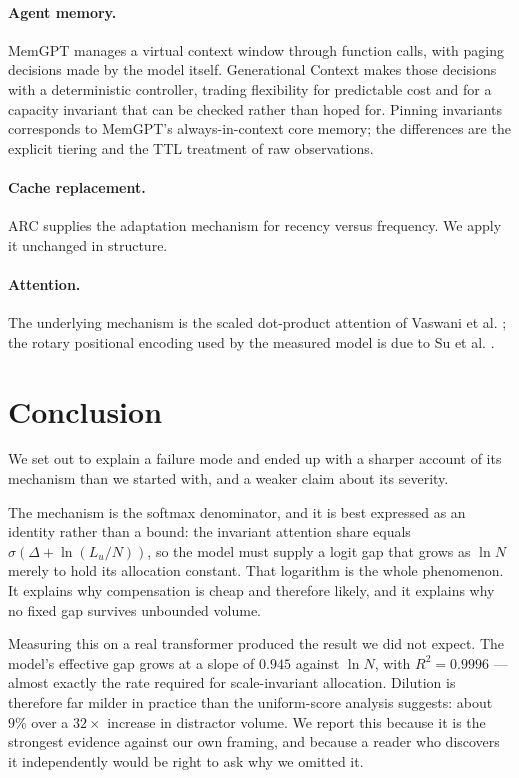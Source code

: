 \documentclass[11pt,a4paper]{article}
\theoremstyle{plain}
\theoremstyle{definition}
\theoremstyle{remark}
\begin{document}
\paragraph{Agent memory.} MemGPT \cite{packer2023memgpt} manages a virtual
context window through function calls, with paging decisions made by the model
itself. Generational Context makes those decisions with a deterministic
controller, trading flexibility for predictable cost and for a capacity
invariant that can be checked rather than hoped for. Pinning invariants
corresponds to MemGPT's always-in-context core memory; the differences are the
explicit tiering and the TTL treatment of raw observations.

\paragraph{Cache replacement.} ARC \cite{megiddo2003arc} supplies the adaptation
mechanism for recency versus frequency. We apply it unchanged in structure.

\paragraph{Attention.} The underlying mechanism is the scaled dot-product
attention of Vaswani et al. \cite{vaswani2017attention}; the rotary positional
encoding used by the measured model is due to Su et al. \cite{su2024roformer}.

\section{Conclusion}
\label{sec:conclusion}

We set out to explain a failure mode and ended up with a sharper account of its
mechanism than we started with, and a weaker claim about its severity.

The mechanism is the softmax denominator, and it is best expressed as an
identity rather than a bound: the invariant attention share equals
$\sigma(\Delta + \ln(L_u/N))$, so the model must supply a logit gap that grows as
$\ln N$ merely to hold its allocation constant. That logarithm is the whole
phenomenon. It explains why compensation is cheap and therefore likely, and it
explains why no fixed gap survives unbounded volume.

Measuring this on a real transformer produced the result we did not expect. The
model's effective gap grows at a slope of $0.945$ against $\ln N$, with
$R^2 = 0.9996$ --- almost exactly the rate required for scale-invariant
allocation. Dilution is therefore far milder in practice than the uniform-score
analysis suggests: about $9\%$ over a $32\times$ increase in distractor volume.
We report this because it is the strongest evidence against our own framing, and
because a reader who discovers it independently would be right to ask why we
omitted it.
\end{document}
